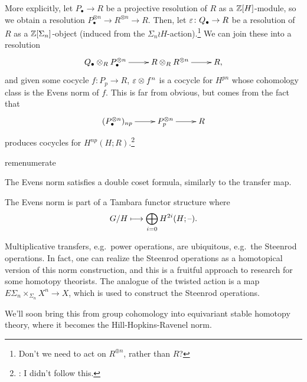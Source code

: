 More explicitly, let $P_\bullet\to R$ be a projective resolution of $R$ as a $\mathbb Z[H]$-module, so we obtain a
resolution $P_\bullet^{\otimes n}\to R^{\otimes n}\to R$. Then, let $\varepsilon\colon Q_\bullet\to R$ be a resolution of
$R$ as a $\mathbb Z[\Sigma_n]$-object (induced from the $\Sigma_n\wr H$-action).\footnote{Don't we need to act on
$R^{\oplus n}$, rather than $R$?} We can join these into a resolution
\[\xymatrix{
	Q_\bullet\otimes_R P_\bullet^{\otimes n}\ar[r] & R\otimes_R R^{\otimes n}\ar[r] & R,
}\]
and given some cocycle $f\colon P_p\to R$, $\varepsilon\otimes f^n$ is a cocycle for $H^{pn}$ whose cohomology class is the
Evens norm of $f$. This is far from obvious, but comes from the fact that
\[\xymatrix{
	(P_\bullet^{\otimes n})_{np}\ar[r] & P_p^{\otimes n}\ar[r] & R
}\]
produces cocycles for $H^{np}(H;R)$.\footnote{\TODO: I didn't follow this.}
\begin{comp}{rem}{enumerate}
	\item The Evens norm satisfies a double coset formula, similarly to the transfer map.
	\item The Evens norm is part of a Tambara functor structure where
	\[G/H\mapsto \bigoplus_{i=0} H^{2i}(H; \bl).\]
	\item Multiplicative transfers, e.g.\ power operations, are ubiquitous, e.g.\ the Steenrod operations. In fact,
	one can realize the Steenrod operations as a homotopical version of this norm
	construction, and this is a fruitful approach to research for some homotopy theorists. The analogue of the
	twisted action is a map $E\Sigma_n\times_{\Sigma_n} X^n\to X$, which is used to construct the Steenrod
	operations. \qedhere
\end{comp}
We'll soon bring this from group cohomology into equivariant stable homotopy theory, where it becomes the
Hill-Hopkins-Ravenel norm.
